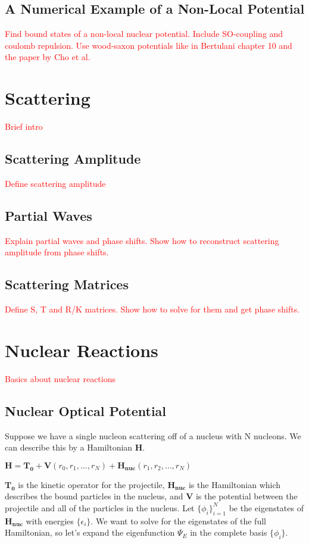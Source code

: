 \documentclass[12pt,letterpaper]{article}
\numberwithin{equation}{section}
\begin{document}
\subsection{A Numerical Example of a Non-Local Potential}
\textcolor{red}{Find bound states of a non-local nuclear potential. Include SO-coupling and coulomb repulsion. Use wood-saxon potentials like in Bertulani chapter 10 and the paper by Cho et al.} 

\section{Scattering}
\textcolor{red}{Brief intro}

\subsection{Scattering Amplitude}
\textcolor{red}{Define scattering amplitude}

\subsection{Partial Waves}
\textcolor{red}{Explain partial waves and phase shifts. Show how to reconstruct scattering amplitude from phase shifts.}

\subsection{Scattering Matrices}
\textcolor{red}{Define S, T and R/K matrices. Show how to solve for them and get phase shifts.}

\section{Nuclear Reactions}
\textcolor{red}{Basics about nuclear reactions}

\subsection{Nuclear Optical Potential}
Suppose we have a single nucleon scattering off of a nucleus with N nucleons. We can describe this by a Hamiltonian $\boldsymbol{H}$.

\begin{center}
$\boldsymbol{H} = \boldsymbol{T_0} + \boldsymbol{V}(r_0, r_1, \dots, r_N) + \boldsymbol{H_{nuc}}(r_1, r_2, \dots, r_N)$
\end{center}

$\boldsymbol{T_0}$ is the kinetic operator for the projectile, $\boldsymbol{H_{nuc}}$ is the Hamiltonian which describes the bound particles in the nucleus, and $\boldsymbol{V}$ is the potential between the projectile and all of the particles in the nucleus. Let $\{\phi_i\}_{i=1}^N$ be the eigenstates of $\boldsymbol{H_{nuc}}$ with energies $\{\epsilon_i\}$. We want to solve for the eigenstates of the full Hamiltonian, so let's expand the eigenfunction $\Psi_E$ in the complete basis $\{\phi_i\}$.
\end{document}
